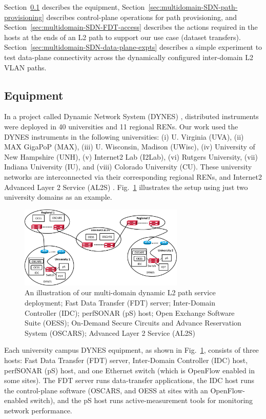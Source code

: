 Section~\ref{sec:multidomain-SDN-deploy-and-config} describes the equipment,
Section~\ref{sec:multidomain-SDN-path-provisioning} describes control-plane
operations for path provisioning, and Section~\ref{sec:multidomain-SDN-FDT-access} describes the actions required
in the hosts at the ends of an L2 path to support our use case (dataset transfers).
Section~\ref{sec:multidomain-SDN-data-plane-expts} describes a simple experiment
to test data-plane connectivity across the dynamically configured inter-domain L2 VLAN paths.

\subsection{Equipment}
\label{sec:multidomain-SDN-deploy-and-config}

In a project called Dynamic Network System (DYNES) \cite{1742-6596-396-4-042065}, distributed instruments were deployed in 40 universities and 11 regional RENs. Our work
used the DYNES instruments in the following universities:
(i) U. Virginia (UVA), (ii) MAX GigaPoP (MAX), (iii) U. Wisconsin, Madison (UWisc), (iv) University of New Hampshire (UNH), (v) Internet2 Lab (I2Lab), (vi) Rutgers University,  (vii) Indiana University (IU), and (viii) Colorado University (CU). These university
networks are interconnected via their corresponding regional RENs, and Internet2 Advanced Layer 2 Service (AL2S) \cite{AL2S}. Fig.~\ref{fig:network} illustrates the setup using just two university domains as an example.
\begin{figure}
\centering               \includegraphics[width=0.7\textwidth]{figures/multi-domain-network.png}
\caption{An illustration of our multi-domain dynamic L2 path service deployment; Fast Data Transfer (FDT) server; Inter-Domain Controller (IDC); perfSONAR (pS) host; Open Exchange Software Suite (OESS); On-Demand Secure Circuits and Advance Reservation System (OSCARS); Advanced Layer 2 Service (AL2S)}
\label{fig:network}
\end{figure}

Each university
campus DYNES equipment, as shown in Fig.~\ref{fig:network},
consists of three hosts: Fast Data Transfer (FDT) server, Inter-Domain Controller (IDC) host, perfSONAR (pS) \cite{perfSONAR} host,
and one Ethernet switch (which is OpenFlow enabled in some sites). The FDT server runs data-transfer applications, the IDC host runs the control-plane software (OSCARS, and OESS at sites with an OpenFlow-enabled switch), and the pS host runs active-measurement tools for monitoring network performance.


